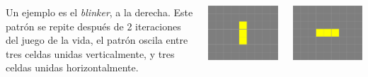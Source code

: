 \documentclass[20pt,margin=2.2cm,innermargin=-4.5in,blockverticalspace=-0.25in]{tikzposter}
\begin{document}
\begin{columns}
{        \vspace{7mm}
        \begin{minipage}[c]{\linewidth}
            \begin{minipage}[c]{0.6\linewidth}
                Un ejemplo es el \textit{blinker}, a la derecha. Este patr\'on se repite despu\'es de 2 iteraciones del juego de la vida, el patr\'on oscila entre tres celdas unidas verticalmente, y tres celdas unidas horizontalmente.
            \end{minipage}
            \quad\quad
            \begin{minipage}[c]{0.15\linewidth}
                \includegraphics[width=\textwidth]{images/life-1.png}
            \end{minipage}
            \begin{minipage}[c]{0.15\linewidth}
                \includegraphics[width=\textwidth]{images/life-2.png}
            \end{minipage}
        \end{minipage}

}
\end{columns}
\end{document}
